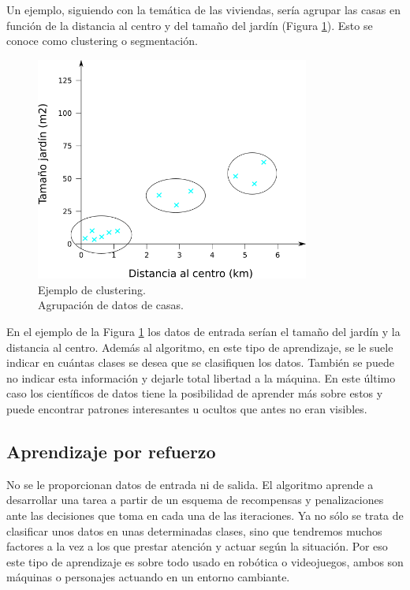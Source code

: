 Un ejemplo, siguiendo con la temática de las viviendas, sería agrupar las casas en función de la distancia al centro y del tamaño del jardín (Figura \ref{fig:ejemplo_clustering}). Esto se conoce como clustering o segmentación.\\

\begin{figure} [h!]
  \begin{center}
    \includegraphics[width=9cm]{figs/ejemplo_no_supervisado.png}
  \end{center}
  \caption{Ejemplo de clustering.\\
            Agrupación de datos de casas.}
  \label{fig:ejemplo_clustering}
\end{figure}

En el ejemplo de la Figura \ref{fig:ejemplo_clustering} los datos de entrada serían el tamaño del jardín y la distancia al centro. Además al algoritmo, en este tipo de aprendizaje, se le suele indicar en cuántas clases se desea que se clasifiquen los datos. También se puede no indicar esta información y dejarle total libertad a la máquina. En este último caso los científicos de datos tiene la posibilidad de aprender más sobre estos y puede encontrar patrones interesantes u ocultos que antes no eran visibles.

\subsection{Aprendizaje por refuerzo}

No se le proporcionan datos de entrada ni de salida. El algoritmo aprende a desarrollar una tarea a partir de un esquema de recompensas y penalizaciones ante las decisiones que toma en cada una de las iteraciones. Ya no sólo se trata de clasificar unos datos en unas determinadas clases, sino que tendremos muchos factores a la vez a los que prestar atención y actuar según la situación. Por eso este tipo de aprendizaje es sobre todo usado en robótica o videojuegos, ambos son máquinas o personajes actuando en un entorno cambiante.\\


